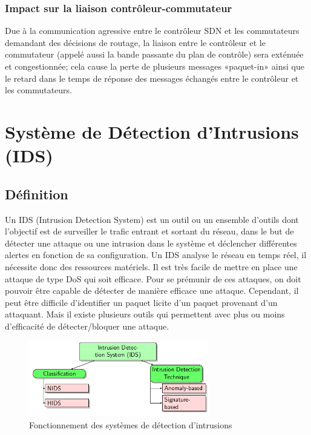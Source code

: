 \subsubsection{Impact sur la liaison contrôleur-commutateur}
Due à la communication agressive entre le contrôleur SDN et les commutateurs demandant des décisions de routage, la liaison entre le contrôleur et le commutateur (appelé aussi la bande passante du plan de contrôle) sera exténuée et congestionnée; cela cause la perte de plusieurs messages «paquet-in» ainsi que le retard dans le temps de réponse des messages échangés entre le contrôleur et les commutateurs.

\section{Système de Détection d’Intrusions (IDS)}

\subsection{Définition}

Un IDS (Intrusion Detection System) est un outil ou un ensemble d’outils dont l’objectif est de surveiller le trafic entrant et sortant du réseau, dans le but de détecter une attaque ou une intrusion dans le système et déclencher différentes alertes en fonction de sa configuration. Un IDS analyse le réseau en temps réel, il nécessite donc des ressources matériels.
Il est très facile de mettre en place une attaque de type DoS qui soit efficace. Pour se prémunir de ces attaques, on doit pouvoir être capable de détecter de manière efficace une attaque. Cependant, il peut être difficile d’identifier un paquet licite d’un paquet provenant d’un attaquant. Mais il existe plusieurs outils qui permettent avec plus ou moins d’efficacité de détecter/bloquer une attaque.

\begin{figure}[h]
\centering
\includegraphics[width=0.7\textwidth]{Figures/IDS}
\decoRule
\caption{Fonctionnement des systèmes de détection d’intrusions}
\label{fig:IDS_Architecture}
\end{figure} 

